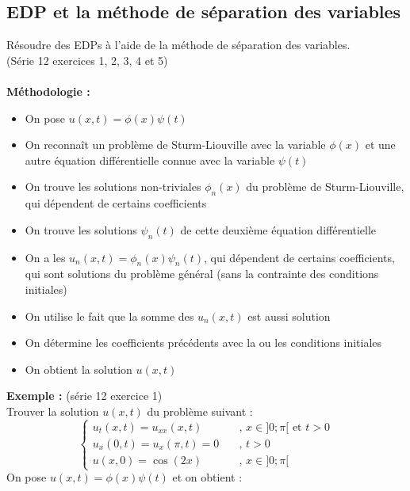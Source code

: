 \subsection{EDP et la méthode de séparation des variables}
Résoudre des EDPs à l’aide de la méthode de séparation des variables. \\
(Série 12 exercices 1, 2, 3, 4 et 5) \\
\\
\textbf{Méthodologie :}
\begin{itemize}
    \item On pose $u(x,t) = \phi(x)\psi(t)$
    \item On reconnaît un problème de Sturm-Liouville avec la variable $\phi(x)$ et une autre équation différentielle connue avec la variable $\psi(t)$
    \item On trouve les solutions non-triviales $\phi_n(x)$ du problème de Sturm-Liouville, qui dépendent de certains coefficients
    \item On trouve les solutions $\psi_n(t)$ de cette deuxième équation différentielle
    \item On a les $u_n(x,t) = \phi_n(x)\psi_n(t)$, qui dépendent de certains coefficients, qui sont solutions du problème général (sans la contrainte des conditions initiales)
    \item On utilise le fait que la somme des $u_n(x,t)$ est aussi solution
    \item On détermine les coefficients précédents avec la ou les conditions initiales
    \item On obtient la solution $u(x,t)$
\end{itemize}
\textbf{Exemple :} (série 12 exercice 1) \\
Trouver la solution $u(x,t)$ du problème suivant :
$$
\begin{cases}
    u_t(x,t) = u_{xx}(x,t) \quad &\text{, } x \in ]0;\pi[ \text{ et } t > 0 \\
    u_x(0,t) = u_x(\pi,t) = 0 \quad &\text{, } t > 0 \\
    u(x,0) = \cos(2x) \quad &\text{, } x \in ]0;\pi[
\end{cases}
$$
On pose $u(x,t) = \phi(x)\psi(t)$ et on obtient :
